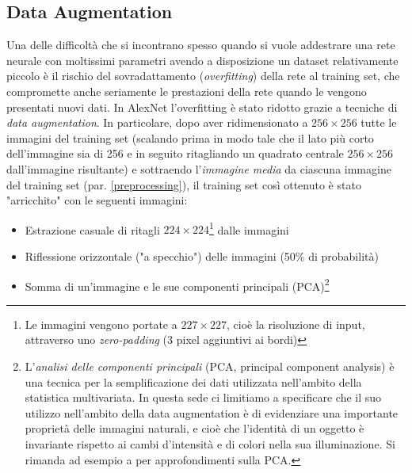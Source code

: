 \subsection{Data Augmentation}
\label{augmentationAlexnet}
Una delle difficoltà che si incontrano spesso quando si vuole addestrare una rete neurale con moltissimi parametri avendo a disposizione un dataset relativamente piccolo è il rischio del sovradattamento (\textit{overfitting}) della rete al training set, che compromette anche seriamente le prestazioni della rete quando le vengono presentati nuovi dati.
In AlexNet l'overfitting è stato ridotto grazie a tecniche di \textit{data augmentation}. In particolare, dopo aver ridimensionato a $256\times 256$ tutte le immagini del training set (scalando prima in modo tale che il lato più corto dell'immagine sia di 256 e in seguito ritagliando un quadrato centrale $256\times 256$ dall'immagine risultante) e sottraendo l'\textit{immagine media} da ciascuna immagine del training set (par. \ref{preprocessing}), il training set così ottenuto è stato "arricchito" con le seguenti immagini:
\begin{itemize}
\item Estrazione casuale di ritagli $224\times 224$\footnote{Le immagini vengono portate a $227\times 227$, cioè la risoluzione di input, attraverso uno \textit{zero-padding} (3 pixel aggiuntivi ai bordi)} dalle immagini
\item Riflessione orizzontale ("a specchio") delle immagini (50\% di probabilità)
\item Somma di un'immagine e le sue componenti principali (PCA)\footnote{L'\textit{analisi delle componenti principali} (PCA, principal component analysis) è una tecnica per la semplificazione dei dati utilizzata nell'ambito della statistica multivariata. In questa sede ci limitiamo a specificare che il suo utilizzo nell'ambito della data augmentation è di evidenziare una importante proprietà delle immagini naturali, e cioè che l'identità di un oggetto è invariante rispetto ai cambi d'intensità e di colori nella sua illuminazione. Si rimanda ad esempio a \cite{PCA} per approfondimenti sulla PCA.}
\end{itemize}

